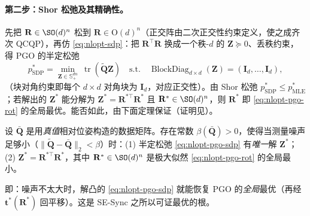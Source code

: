\paragraph{第二步：Shor 松弛及其精确性。}\cite{rosen2019sesync}
先把 $\mathbf{R}\in\SO(d)^n$ 松到 $\mathbf{R}\in\mathrm{O}(d)^n$（正交阵由二次正交性约束定义，使之成齐次 QCQP），再仿 \cref{eq:nlopt-sdp}：把 $\mathbf{R}^\top\mathbf{R}$ 换成一个秩-$d$ 的 $\mathbf{Z}\succeq0$、丢秩约束，得 PGO 的半定松弛
\begin{equation}
  p^*_{\mathrm{SDP}}=\min_{\mathbf{Z}\in\mathbb{S}^{dn}_+}\ \operatorname{tr}(\tilde{\mathbf{Q}}\mathbf{Z})
  \quad\text{s.t.}\quad \operatorname{BlockDiag}_{d\times d}(\mathbf{Z})=(\mathbf{I}_d,\dots,\mathbf{I}_d),
  \label{eq:nlopt-pgo-sdp}
\end{equation}
（块对角约束即每个 $d\times d$ 对角块为 $\mathbf{I}_d$，对应正交性）。由 Shor 松弛 $p^*_{\mathrm{SDP}}\le p^*_{\mathrm{MLE}}$；若解出的 $\mathbf{Z}^*$ 能分解为 $\mathbf{Z}^*=\mathbf{R}^{*\top}\mathbf{R}^*$ 且 $\mathbf{R}^*\in\SO(d)^n$，则 $\mathbf{R}^*$ 即 \cref{eq:nlopt-pgo-rot} 的全局最优。能否如此，由下面定理保证（证明见\cite{rosen2019sesync}）。

\begin{theorem}\label{thm:nlopt-sesync-exact}
设 $\bar{\mathbf{Q}}$ 是用\emph{真值}相对位姿构造的数据矩阵。存在常数 $\beta(\bar{\mathbf{Q}})>0$，使得当测量噪声足够小（$\|\tilde{\mathbf{Q}}-\bar{\mathbf{Q}}\|_2<\beta$）时：(1) 半定松弛 \cref{eq:nlopt-pgo-sdp} 有\emph{唯一}解 $\mathbf{Z}^*$；(2) $\mathbf{Z}^*=\mathbf{R}^{*\top}\mathbf{R}^*$，其中 $\mathbf{R}^*\in\SO(d)^n$ 是极大似然 \cref{eq:nlopt-pgo-rot} 的全局最小。
\end{theorem}

\noindent 即：噪声不太大时，解凸的 \cref{eq:nlopt-pgo-sdp} 就能恢复 PGO 的\emph{全局}最优（再经 $\mathbf{t}^*(\mathbf{R}^*)$ 回平移）。这是 SE-Sync 之所以可证最优的根。


